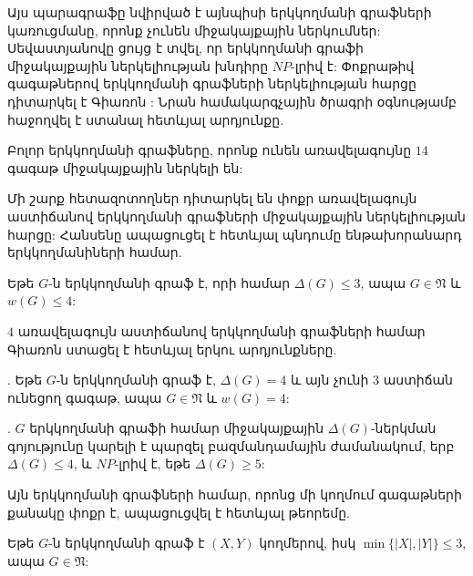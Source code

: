 Այս պարագրաֆը նվիրված է այնպիսի երկկողմանի գրաֆների կառուցմանը, որոնք չունեն միջակայքային ներկումներ: Սեվաստյանովը \cite{Sevastyanov1990} ցույց է տվել, որ երկկողմանի գրաֆի միջակայքային ներկելիության խնդիրը $NP$-լրիվ է: Փոքրաթիվ գագաթներով երկկողմանի գրաֆների ներկելիության հարցը դիտարկել է Գիառոն \cite{Giaro1999}: Նրան համակարգչային ծրագրի օգնությամբ հաջողվել է ստանալ հետևյալ արդյունքը.

\begin{theorem}
\label{t3_Giaro_14} Բոլոր երկկողմանի գրաֆները, որոնք ունեն առավելագույնը $14$ գագաթ միջակայքային ներկելի են:
\end{theorem}

Մի շարք հետազոտողներ դիտարկել են փոքր առավելագույն աստիճանով երկկողմանի գրաֆների միջակայքային ներկելիության հարցը: Հանսենը ապացուցել է հետևյալ պնդումը ենթախորանարդ երկկողմանիների համար.
\begin{theorem}
\label{t3_Hansen_Delta3}\cite{Hansen1992} Եթե $G$-ն երկկողմանի գրաֆ է, որի համար 
$\Delta(G)\leq 3$, ապա $G\in \mathfrak{N}$ և $w(G)\leq 4$:
\end{theorem}

$4$ առավելագույն աստիճանով երկկողմանի գրաֆների համար Գիառոն ստացել է հետևյալ երկու արդյունքները.

\begin{theorem}
\label{t3_Giaro_Delta4_no3}\cite{Giaro1997}. Եթե $G$-ն երկկողմանի գրաֆ է, 
$\Delta(G)=4$ և այն չունի $3$ աստիճան ունեցող գագաթ, ապա $G\in
\mathfrak{N}$ և $w(G)=4$:
\end{theorem}

\begin{theorem}
\label{t3_Giaro_complexity}\cite{Giaro1997}. $G$ երկկողմանի գրաֆի համար միջակայքային $\Delta(G)$-ներկման գոյությունը կարելի է պարզել բազմանդամային ժամանակում, երբ $\Delta(G)\leq 4$, և $NP$-լրիվ է, եթե $\Delta(G)\geq 5$:
\end{theorem}

Այն երկկողմանի գրաֆների համար, որոնց մի կողմում գագաթների քանակը փոքր է, ապացուցվել է հետևյալ թեորեմը.

\begin{theorem}
\label{t3_GiaroKubaleMalafiejski_min3}\cite{GiaroKubaleMalafiejski1999} Եթե $G$-ն երկկողմանի գրաֆ է $(X,Y)$ կողմերով, իսկ $\min \{\vert X\vert, \vert Y\vert\}\leq 3$, ապա $G\in
\mathfrak{N}$:
\end{theorem}

